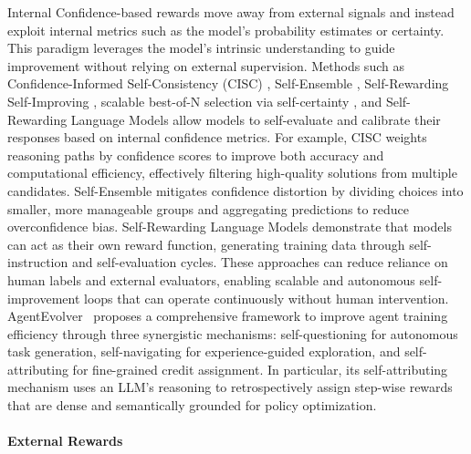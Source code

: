 Internal Confidence-based rewards move away from external signals and instead exploit internal metrics such as the model’s probability estimates or certainty. This paradigm leverages the model's intrinsic understanding to guide improvement without relying on external supervision. Methods such as Confidence-Informed Self-Consistency (CISC) \citep{taubenfeld2025cisc}, Self-Ensemble \citep{xu2025selfensemblemitigatingconfidencedistortion}, Self-Rewarding Self-Improving \citep{simonds2025selfrewardingselfimproving}, scalable best-of-N selection via self-certainty \citep{kang2025scalablebestofnselectionlarge}, and Self-Rewarding Language Models \citep{yuan2025selfrewardinglanguagemodels} allow models to self-evaluate and calibrate their responses based on internal confidence metrics. For example, CISC weights reasoning paths by confidence scores to improve both accuracy and computational efficiency, effectively filtering high-quality solutions from multiple candidates. Self-Ensemble mitigates confidence distortion by dividing choices into smaller, more manageable groups and aggregating predictions to reduce overconfidence bias. Self-Rewarding Language Models demonstrate that models can act as their own reward function, generating training data through self-instruction and self-evaluation cycles. These approaches can reduce reliance on human labels and external evaluators, enabling scalable and autonomous self-improvement loops that can operate continuously without human intervention. AgentEvolver~\citep{zhai2025agentevolver} proposes a comprehensive framework to improve agent training efficiency through three synergistic mechanisms: self-questioning for autonomous task generation, self-navigating for experience-guided exploration, and self-attributing for fine-grained credit assignment. In particular, its self-attributing mechanism uses an LLM's reasoning to retrospectively assign step-wise rewards that are dense and semantically grounded for policy optimization.

\paragraph{External Rewards}

